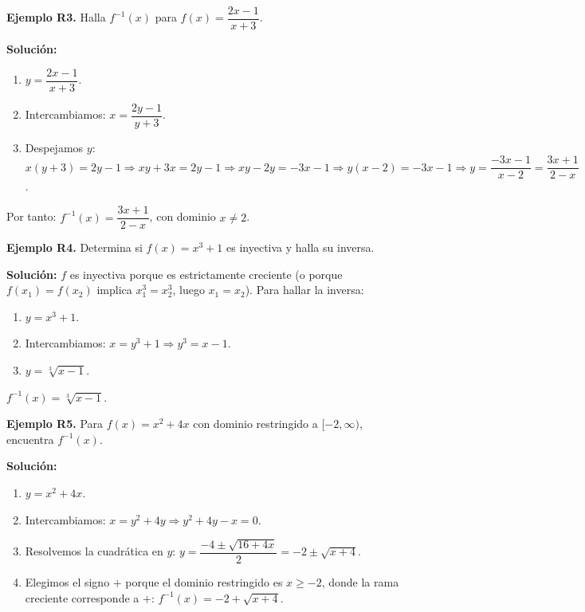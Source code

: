 \documentclass[12pt, letterpaper]{article}
\begin{document}
\textbf{Ejemplo R3.} Halla $f^{-1}(x)$ para $f(x) = \dfrac{2x - 1}{x + 3}$.

\begin{cuadrosolucion}
  \textbf{Solución:}
  \begin{enumerate}
    \item $y = \dfrac{2x - 1}{x + 3}$.
    \item Intercambiamos: $x = \dfrac{2y - 1}{y + 3}$.
    \item Despejamos $y$: $x(y + 3) = 2y - 1 \Rightarrow xy + 3x = 2y - 1 \Rightarrow xy - 2y = -3x - 1 \Rightarrow y(x - 2) = -3x - 1 \Rightarrow y = \dfrac{-3x - 1}{x - 2} = \dfrac{3x + 1}{2 - x}$.
  \end{enumerate}
  Por tanto: $f^{-1}(x) = \dfrac{3x + 1}{2 - x}$, con dominio $x \neq 2$.
\end{cuadrosolucion}

\textbf{Ejemplo R4.} Determina si $f(x) = x^3 + 1$ es inyectiva y halla su inversa.

\begin{cuadrosolucion}
  \textbf{Solución:} $f$ es inyectiva porque es estrictamente creciente (o porque $f(x_1) = f(x_2)$ implica $x_1^3 = x_2^3$, luego $x_1 = x_2$). Para hallar la inversa:
  \begin{enumerate}
    \item $y = x^3 + 1$.
    \item Intercambiamos: $x = y^3 + 1 \Rightarrow y^3 = x - 1$.
    \item $y = \sqrt[3]{x - 1}$.
  \end{enumerate}
  $f^{-1}(x) = \sqrt[3]{x - 1}$.
\end{cuadrosolucion}

\newpage

\textbf{Ejemplo R5.} Para $f(x) = x^2 + 4x$ con dominio restringido a $[-2, \infty)$, encuentra $f^{-1}(x)$.

\begin{cuadrosolucion}
  \textbf{Solución:}
  \begin{enumerate}
    \item $y = x^2 + 4x$.
    \item Intercambiamos: $x = y^2 + 4y \Rightarrow y^2 + 4y - x = 0$.
    \item Resolvemos la cuadrática en $y$: $y = \dfrac{-4 \pm \sqrt{16 + 4x}}{2} = -2 \pm \sqrt{x + 4}$.
    \item Elegimos el signo $+$ porque el dominio restringido es $x \geq -2$, donde la rama creciente corresponde a $+$:
          $f^{-1}(x) = -2 + \sqrt{x + 4}$.
  \end{enumerate}
\end{cuadrosolucion}
\end{document}
